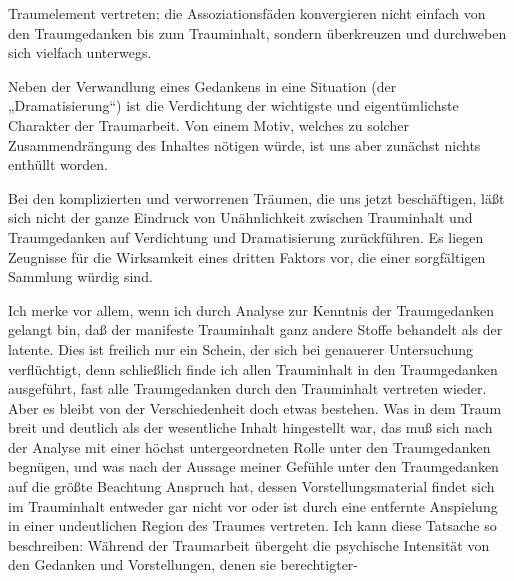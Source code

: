 \documentclass[twoside=true,titlepage=false,open=any, parskip=never, fontsize=10pt, headings=small, chapterprefix=false, appendixprefix=false]{scrbook}
\begin{document}
        \pstart
        Traumelement vertreten; die
               Assoziationsfäden konvergieren nicht einfach von den Traumgedanken
               bis zum Trauminhalt, sondern überkreuzen und durchweben sich
               vielfach unterwegs.
        \pend
    
            
        \pstart
        Neben der Verwandlung eines Gedankens in eine Situation (der „Dramatisierung“)
               ist die Verdichtung der wichtigste und eigentümlichste Charakter der
               Traumarbeit. Von einem Motiv, welches zu solcher Zusammendrängung des Inhaltes
               nötigen würde, ist uns aber zunächst nichts enthüllt worden.
        \pend
    
         
            
            
            \pstart[\section{V}]\pend
            
        \pstart
        Bei den komplizierten und verworrenen Träumen, die uns jetzt beschäftigen, läßt
               sich nicht der ganze Eindruck von Unähnlichkeit zwischen Trauminhalt und
               Traumgedanken auf Verdichtung und Dramatisierung zurückführen. Es liegen Zeugnisse für die Wirksamkeit eines dritten Faktors vor, die einer
               sorgfältigen Sammlung würdig sind.
        \pend
    
            
        \pstart
        Ich merke vor allem, wenn ich durch Analyse zur Kenntnis der Traumgedanken
               gelangt bin, daß der manifeste Trauminhalt ganz andere Stoffe behandelt als der
               latente. Dies ist freilich nur ein Schein, der sich bei genauerer Untersuchung
               verflüchtigt, denn schließlich finde ich allen Trauminhalt in den Traumgedanken ausgeführt, fast alle Traumgedanken durch den Trauminhalt vertreten wieder. Aber es bleibt von der Verschiedenheit
               doch etwas bestehen. Was in dem Traum breit und deutlich als der wesentliche
               Inhalt hingestellt war, das muß sich nach der Analyse mit einer höchst
               untergeordneten Rolle unter den Traumgedanken begnügen, und was nach
               der Aussage meiner Gefühle unter den Traumgedanken auf die größte Beachtung
               Anspruch hat, dessen Vorstellungsmaterial findet sich im Trauminhalt entweder gar nicht vor oder ist durch eine entfernte Anspielung in
               einer undeutlichen Region des Traumes vertreten. Ich kann diese Tatsache so
                  beschreiben: Während der Traumarbeit übergeht die
                  psychische Intensität von den Gedanken und Vorstellungen, denen sie
                  berechtigter-
        \pend
    
\end{document}
